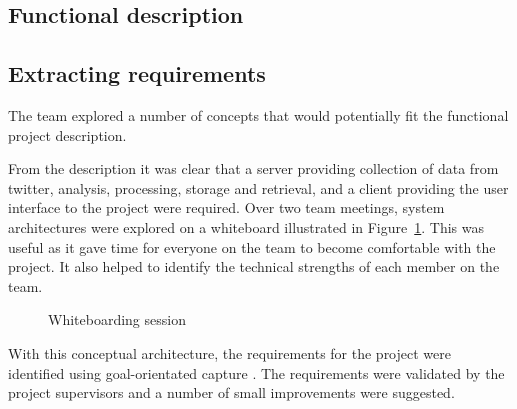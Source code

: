 \subsection{Functional description}
	

\subsection{Extracting requirements}
The team explored a number of concepts that would potentially fit the
functional project description.

From the description it was clear that a server providing collection of data
from twitter, analysis, processing, storage and retrieval, and a client
providing the user interface to the project were required. Over two team
meetings, system architectures were explored on a whiteboard illustrated in
Figure~\ref{fig:whiteboarding_session}. This was useful as it gave time for
everyone on the team to become comfortable with the project. It also helped to
identify the technical strengths of each member on the team.

\begin{figure}[htb]
\centering
\mbox{}

\caption{Whiteboarding session}
\label{fig:whiteboarding_session}
\end{figure}

With this conceptual architecture, the requirements for the project were
identified using goal-orientated capture \cite{dardenne93}. The requirements were validated by
the project supervisors and a number of small improvements were suggested.

